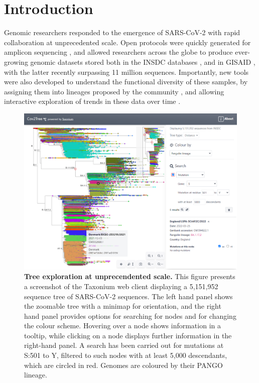 \documentclass[twocolumn]{bioRxiv}
\begin{document}
\section*{Introduction}\label{s:introduction}

Genomic researchers responded to the emergence of SARS-CoV-2 with rapid collaboration at unprecedented scale. Open protocols were quickly generated for amplicon sequencing \citep{Tyson2020}, and allowed researchers across the globe to produce ever-growing genomic datasets stored both in the INSDC databases \citep{insdc}, and in GISAID \citep{shu2017gisaid}, with the latter recently surpassing 11 million sequences. Importantly, new tools were also developed to understand the functional diversity of these samples, by assigning them into lineages proposed by the community \citep{rambaut2020dynamic, o2021assignment}, and allowing interactive exploration of trends in these data over time \citep{hodcroft_2021, chen2022cov, outbreakinfo}.


\begin{figure}

\begin{center}
\includegraphics[width=\linewidth]{Figures/cov2tree.png}
\end{center}
\caption{\textbf{Tree exploration at unprecendented scale.} This figure presents a screenshot of the Taxonium web client displaying a 5,151,952 sequence tree of SARS-CoV-2 sequences. The left hand panel shows the zoomable tree with a minimap for orientation, and the right hand panel provides options for searching for nodes and for changing the colour scheme. Hovering over a node shows information in a tooltip, while clicking on a node displays further information in the right-hand panel. A search has been carried out for mutations at S:501 to Y, filtered to such nodes with at least 5,000 descendants, which are circled in red. Genomes are coloured by their PANGO lineage.}
\label{fig:taxonium_client}
\end{figure}
\end{document}
